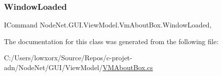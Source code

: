 \subsubsection{\texorpdfstring{Window\+Loaded}{WindowLoaded}}
{\footnotesize\ttfamily I\+Command Node\+Net.\+G\+U\+I.\+View\+Model.\+Vm\+About\+Box.\+Window\+Loaded\hspace{0.3cm}{\ttfamily [get]}, {\ttfamily [set]}}



The documentation for this class was generated from the following file\+:\begin{DoxyCompactItemize}
\item 
C\+:/\+Users/lowxorx/\+Source/\+Repos/c-\/projet-\/adn/\+Node\+Net/\+G\+U\+I/\+View\+Model/\hyperlink{_v_m_about_box_8cs}{V\+M\+About\+Box.\+cs}\end{DoxyCompactItemize}
